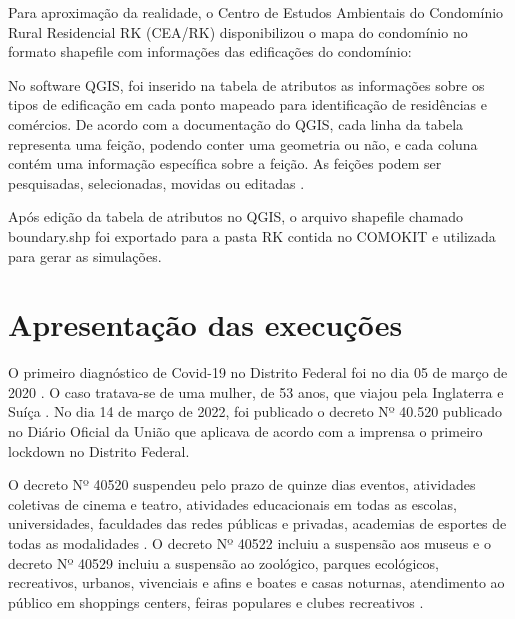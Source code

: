 Para aproximação da realidade, o Centro de Estudos Ambientais do Condomínio Rural Residencial RK (CEA/RK) disponibilizou o mapa do condomínio no formato shapefile com informações das edificações do condomínio:


No software QGIS, foi inserido na tabela de atributos as informações sobre os tipos de edificação em cada ponto mapeado para identificação de residências e comércios. De acordo com a documentação do QGIS, cada linha da tabela representa uma feição, podendo conter uma geometria ou não, e cada coluna contém uma informação específica sobre a feição. As feições podem ser pesquisadas, selecionadas, movidas ou editadas \cite{DocQGIS:online}.


Após edição da tabela de atributos no QGIS, o arquivo shapefile chamado boundary.shp foi exportado para a pasta RK contida no COMOKIT e utilizada para gerar as simulações.



\section{Apresentação das execuções}

O primeiro diagnóstico de Covid-19 no Distrito Federal foi no dia 05 de março de 2020 \cite{SESCovid19S7:online}. O caso tratava-se de uma mulher, de 53 anos, que viajou pela Inglaterra e Suíça \cite{Brasilco67:online}. No dia 14 de março de 2022, foi publicado o decreto Nº 40.520 publicado no Diário Oficial da União que aplicava de acordo com a imprensa \cite{CorreioBraziliense032020:online} o primeiro lockdown no Distrito Federal.

O decreto Nº 40520 suspendeu pelo prazo de quinze dias eventos, atividades coletivas de cinema e teatro, atividades educacionais em todas as escolas, universidades, faculdades das redes públicas e privadas, academias de esportes de todas as modalidades \cite{Brasilco67:online}. O decreto Nº 40522 incluiu a suspensão aos museus \cite{Decreto441:online} e o decreto Nº 40529 incluiu a suspensão ao zoológico, parques ecológicos, recreativos, urbanos, vivenciais e afins e boates e casas noturnas, atendimento ao público em shoppings centers, feiras populares e clubes recreativos \cite{Decreto412:online}.

